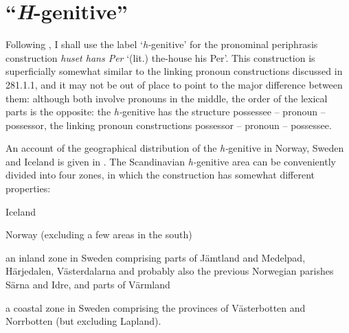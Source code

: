 \section{“\textit{H}{}-genitive”}
\label{bkm:Ref154988643}
\begin{styleBodyTextFirst}
Following \citet{Delsing2003b}, I shall use the label ‘\textit{h-}genitive’ for the pronominal periphrasis construction \textit{huset hans Per} ‘(lit.) the-house his Per’. This construction is superficially somewhat similar to the linking pronoun constructions discussed in 281.1.1, and it may not be out of place to point to the major difference between them: although both involve pronouns in the middle, the order of the lexical parts is the opposite: the \textit{h-}genitive has the structure possessee – pronoun – possessor, the linking pronoun constructions possessor – pronoun – possessee.

\end{styleBodyTextFirst}

\begin{styleBodytextC}
An account of the geographical distribution of the \textit{h-}genitive in Norway, Sweden and Iceland is given in \citet[34]{Delsing2003a}. The Scandinavian \textit{h-}genitive area can be conveniently divided into four zones, in which the construction has somewhat different properties:

\end{styleBodytextC}


\begin{listWWNumxleveli}
\item {}

\begin{styleListii}
Iceland

\end{styleListii}

\item {}

\begin{styleListii}
Norway (excluding a few areas in the south) 

\end{styleListii}

\item {}

\begin{styleListii}
an inland zone in Sweden comprising parts of Jämtland and Medelpad, Härjedalen, Västerdalarna and probably also the previous Norwegian parishes Särna and Idre, and parts of Värmland

\end{styleListii}

\item {}

\begin{styleListii}
a coastal zone in Sweden comprising the provinces of Västerbotten and Norrbotten (but excluding Lapland).

\end{styleListii}

\end{listWWNumxleveli}

